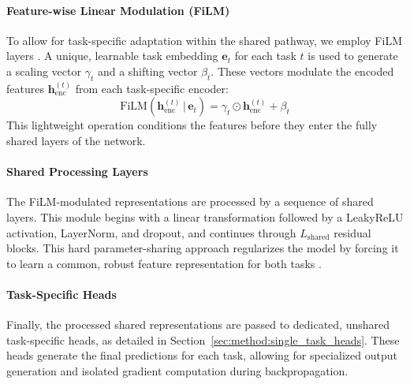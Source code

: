 \paragraph*{Feature-wise Linear Modulation (FiLM)}
To allow for task-specific adaptation within the shared pathway, we employ FiLM layers \cite{perez2018film}. A unique, learnable task embedding $\mathbf{e}_{t}$ for each task $t$ is used to generate a scaling vector $\gamma_{t}$ and a shifting vector $\beta_{t}$. These vectors modulate the encoded features $\mathbf{h}_{\mathrm{enc}}^{(t)}$ from each task-specific encoder:
$$
\mathrm{FiLM}(\mathbf{h}_{\mathrm{enc}}^{(t)} \,|\, \mathbf{e}_{t}) = \gamma_{t} \odot \mathbf{h}_{\mathrm{enc}}^{(t)} + \beta_{t}
$$
This lightweight operation conditions the features before they enter the fully shared layers of the network.

\paragraph*{Shared Processing Layers}
The FiLM-modulated representations are processed by a sequence of shared layers. This module begins with a linear transformation followed by a LeakyReLU activation, LayerNorm, and dropout, and continues through $L_{\mathrm{shared}}$ residual blocks. This hard parameter-sharing approach regularizes the model by forcing it to learn a common, robust feature representation for both tasks \cite{baxter2000model}.

\paragraph*{Task-Specific Heads}
Finally, the processed shared representations are passed to dedicated, unshared task-specific heads, as detailed in Section~\ref{sec:method:single_task_heads}. These heads generate the final predictions for each task, allowing for specialized output generation and isolated gradient computation during backpropagation.

